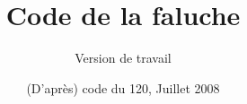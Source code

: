 \documentclass[a4paper,10pt]{report}
\begin{document}
\title{\textbf{Code de la faluche}}
\date{(D'après) \og code du 120\fg, Juillet 2008}
\author{Version de travail}

\maketitle




\tableofcontents
\end{document}
